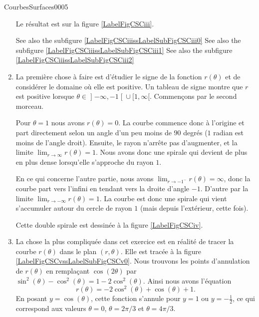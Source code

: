 \begin{corrige}{CourbesSurfaces0005}
\begin{enumerate}
			\newcommand{\CaptionFigCSCiii}{La courbe de l'exercice \ref{exoCourbesSurfaces0005}.\ref{CSCiii}. Les deux premières branches sont dessinées. Notez que la seconde est beaucoup plus petite que la première, et qu'elle part de \( (0,0)\).}

            Le résultat est sur la figure \ref{LabelFigCSCiii}.
            
            See also the subfigure \ref{LabelFigCSCiiissLabelSubFigCSCiii0}
            See also the subfigure \ref{LabelFigCSCiiissLabelSubFigCSCiii1}
            See also the subfigure \ref{LabelFigCSCiiissLabelSubFigCSCiii2}

		\item

			La première chose à faire est d'étudier le signe de la fonction $r(\theta)$ et de considérer le domaine où elle est positive. Un tableau de signe montre que $r$ est positive lorsque $\theta\in\mathopen] -\infty , -1 \mathclose[\cup\mathopen[ 1 , \infty [$. Commençons par le second morceau. 

			Pour $\theta=1$ nous avons $r(\theta)=0$. La courbe commence donc à l'origine et part directement selon un angle d'un peu moins de $90$ degrés ($1$ radian est moins de l'angle droit). Ensuite, le rayon n'arrête pas d'augmenter, et la limite $\lim_{r\to \infty} r(\theta)=1$. Nous avons donc une spirale qui devient de plus en plus dense lorsqu'elle s'approche du rayon $1$.

			En ce qui concerne l'autre partie, nous avons $\lim_{r\to -1^{-}} r(\theta)=\infty$, donc la courbe part vers l'infini en tendant vers la droite d'angle $-1$. D'autre par la limite $\lim_{r\to -\infty} r(\theta)=1$. La courbe est donc une spirale qui vient s'accumuler autour du cercle de rayon $1$ (mais depuis l'extérieur, cette fois).
			
			Cette double spirale est dessinée à la figure \ref{LabelFigCSCiv}.
			\newcommand{\CaptionFigCSCiv}{La courbe de l'exercice \ref{exoCourbesSurfaces0005}.\ref{CSCiv}.}
			

		\item

\newcommand{\CaptionFigCSCv}{La courbe de l'exercice \ref{exoCourbesSurfaces0005}.\ref{CSCv}.}


			La chose la plus compliquée dans cet exercice est en réalité de tracer la courbe $r(\theta)$ dans le plan $(r,\theta)$. Elle est tracée à la figure \ref{LabelFigCSCvssLabelSubFigCSCv0}. Nous trouvons les points d'annulation de $r(\theta)$ en remplaçant $\cos(2\theta)$ par $\sin^2(\theta)-\cos^2(\theta)=1-2\cos^2(\theta)$. Ainsi nous avons l'équation
			\begin{equation}
				r(\theta)=-2\cos^2(\theta)+\cos(\theta)+1.
			\end{equation}
			En posant $y=\cos(\theta)$, cette fonction s'annule pour $y=1$ ou $y=-\frac{ 1 }{2}$, ce qui correspond aux valeurs $\theta=0$, $\theta=2\pi/3$ et $\theta=4\pi/3$.


\end{enumerate}
\end{corrige}
